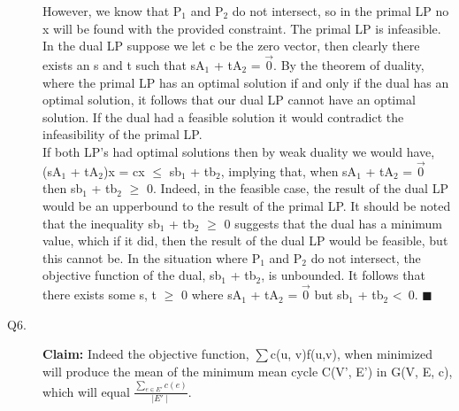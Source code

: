 \documentclass[10pt]{csc_assignment}
\begin{document}
\begin{description}
However, we know that P$_{1}$ and P$_{2}$ do not intersect, so in the primal LP no
x will be found with the provided constraint. The primal LP is infeasible. In the dual LP suppose we let c be the zero vector, then clearly there exists an s and t such that sA$_{1}$ + tA$_{2}$ = $\vec{0}$. By the theorem of duality, where the primal LP has an optimal solution if and only if the dual has an optimal solution, it follows that our dual LP cannot have an optimal solution. If the dual had a feasible solution it would contradict the infeasibility of the primal LP.\\

If both LP's had optimal solutions then by weak duality we would have,  
(sA$_{1}$ + tA$_{2}$)x = cx $\leqslant$ sb$_{1}$ + tb$_{2}$, implying that, when sA$_{1}$ + tA$_{2}$ = $\vec{0}$ then sb$_{1}$ + tb$_{2}$ $\geqslant$ 0. Indeed, in the feasible case, the result of the dual LP would be an upperbound to the result of the primal LP. It should be noted that the inequality sb$_{1}$ + tb$_{2}$ $\geqslant$ 0 suggests that the dual has a minimum value, which if it did, then the result of the dual LP would be feasible, but this cannot be. In the situation where P$_{1}$ and P$_{2}$ do not intersect, the objective function of the dual, sb$_{1}$ + tb$_{2}$, is unbounded. It follows that there exists some s, t $\geqslant$ 0  where sA$_{1}$ + tA$_{2}$ = $\vec{0}$ but sb$_{1}$ + tb$_{2}$ \textless ~0. $\blacksquare$


\newpage
\item[Q6.]
\textbf{Claim:} Indeed the objective function, $\sum$c(u, v)f(u,v), when minimized will produce 
the mean of the minimum mean cycle C(V', E') in G(V, E, c), which will equal
$\frac{\sum_{e \in E'} c(e)}{\mid E' \mid}$.\\


\end{description}
\end{document}
